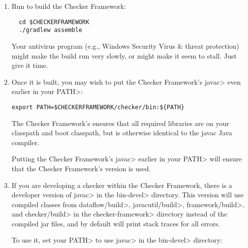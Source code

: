 

\begin{enumerate}

\item
Run  to build the Checker Framework:

\begin{Verbatim}
  cd $CHECKERFRAMEWORK
  ./gradlew assemble
\end{Verbatim}

\noindent
Your antivirus program (e.g., Windows Security Virus \& threat protection)
might make the build run very slowly, or might make it seem to stall.  Just
give it time.

\item
Once it is built, you may wish to put the Checker Framework's \<javac>
even earlier in your \<PATH>:

\begin{Verbatim}
export PATH=$CHECKERFRAMEWORK/checker/bin:${PATH}
\end{Verbatim}

The Checker Framework's  ensures that all required
libraries are on your classpath and boot classpath, but is otherwise
identical to the javac Java compiler.

Putting the Checker Framework's \<javac> earlier in your \<PATH> will
ensure that the Checker Framework's version is used.

\item
If you are developing a checker within the Checker Framework, there is
a developer version of \<javac> in the \<bin-devel> directory. This
version will use compiled classes from \<dataflow/build>,
\<javacutil/build>, \<framework/build>,
and \<checker/build> in the \<checker-framework> directory instead of
the compiled jar files, and by default will print stack traces for all
errors.

To use it, set your \<PATH> to use \<javac> in the \<bin-devel> directory:


\end{enumerate}
